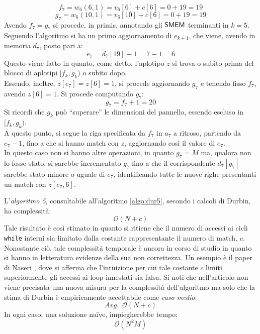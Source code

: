 \begin{esempio}
  \[f_7=w_6(6,1)=v_6[6]+c[6]=0+19=19\]
  \[g_7=w_6(10,1)=v_6[10]+c[6]=0+19=19\]
  Avendo $f_7=g_7$ si procede, in primis, annotando gli $\mbox{\rm {\sf SMEM}}$ terminanti in
  $k=5$.\\
  Seguendo l'algoritmo si ha un primo aggiornamento di $e_{k+1}$, che
  viene, avendo in memoria $d_7$, posto pari a: 
  \[e_7=d_7[19]-1=7-1=6\]
  Questo viene fatto in quanto, come detto, l'aplotipo $z$ si trova o subito
  prima del blocco di aplotipi $[f_k,g_k)$ o subito dopo.\\
  Essendo, inoltre, $z[e_7]=z[6]=1$, si procede aggiornando $g_7$ e tenendo fisso
  $f_7$, avendo $z[6]=1$. Si procede computando $g_7$:
  \[g_7=f_7+1=20\]
  Si ricordi che $g_k$ può ``superare'' le dimensioni del pannello, essendo
  escluso in $[f_k,g_k)$.\\
  A questo punto, si segue la riga specificata da $f_7$ in $a_7$ a ritroso,
  partendo da $e_7-1$, fino a che si hanno match con $z$, aggiornando così il
  valore di $e_7$.\\
  In questo caso non si hanno altre operazioni, in quanto $g_7=M$ ma, qualora
  non lo fosse stato, si sarebbe incrementato $g_7$ fino a che il corrispondente
  $d_7[g_7]$ sarebbe stato minore o uguale di $e_7$, identificando tutte le
  nuove righe presentanti un match con $z[e_7, 6]$.
\end{esempio}
L'\textit{algoritmo 5}, consultabile all'algoritmo \ref{algo:dur5}, secondo i
calcoli di Durbin, ha complessità:
\begin{equation}
  \label{eq:pbwtsmem5}
  \mathcal{O}(N+c)
\end{equation}
Tale risultato è così stimato in quanto si ritiene che il
numero di accessi ai cicli \texttt{while} interni sia limitato dalla costante
rappresentante il 
numero di match, $c$. Nonostante ciò, tale complessità temporale è ancora in
corso di studio in quanto si hanno in letteratura evidenze della sua non
correttezza. Un esempio è il paper di Naseri \cite{dpbwt}, dove si afferma che
l'intuizione per cui tale costante $c$ limiti superiormente gli accessi ai loop
innestati sia falsa. Si noti che nell'articolo non viene precisata una
nuova misura per la complessità dell'algoritmo ma solo che la stima di Durbin è
empiricamente accettabile come \textit{caso medio}:
\begin{equation}
  \label{eq:pbwtsmem6}
  Avg.\,\,\,\mathcal{O}(N+c)
\end{equation}
In ogni caso, una soluzione na\"{i}ve, impiegherebbe tempo:
\begin{equation}
  \label{eq:pbwtsmem7}
  \mathcal{O}(N^2M)
\end{equation}
